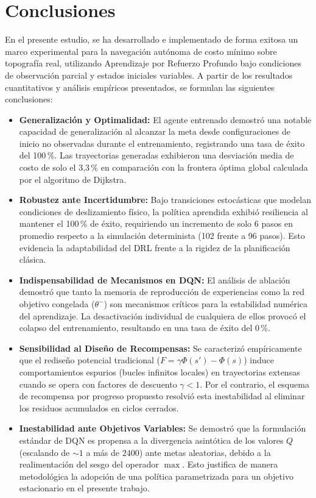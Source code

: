 \section{Conclusiones}
\label{sec:conc}

En el presente estudio, se ha desarrollado e implementado de forma exitosa un marco experimental para la navegación autónoma de costo mínimo sobre topografía real, utilizando Aprendizaje por Refuerzo Profundo bajo condiciones de observación parcial y estados iniciales variables. A partir de los resultados cuantitativos y análisis empíricos presentados, se formulan las siguientes conclusiones:

\begin{itemize}
  \item \textbf{Generalización y Optimalidad:} El agente entrenado demostró una notable capacidad de generalización al alcanzar la meta desde configuraciones de inicio no observadas durante el entrenamiento, registrando una tasa de éxito del 100\,\%. Las trayectorias generadas exhibieron una desviación media de costo de solo el 3,3\,\% en comparación con la frontera óptima global calculada por el algoritmo de Dijkstra.
  \item \textbf{Robustez ante Incertidumbre:} Bajo transiciones estocásticas que modelan condiciones de deslizamiento físico, la política aprendida exhibió resiliencia al mantener el 100\,\% de éxito, requiriendo un incremento de solo 6 pasos en promedio respecto a la simulación determinista (102 frente a 96 pasos). Esto evidencia la adaptabilidad del DRL frente a la rigidez de la planificación clásica.
  \item \textbf{Indispensabilidad de Mecanismos en DQN:} El análisis de ablación demostró que tanto la memoria de reproducción de experiencias como la red objetivo congelada ($\theta^-$) son mecanismos críticos para la estabilidad numérica del aprendizaje. La desactivación individual de cualquiera de ellos provocó el colapso del entrenamiento, resultando en una tasa de éxito del 0\,\%.
  \item \textbf{Sensibilidad al Diseño de Recompensas:} Se caracterizó empíricamente que el rediseño potencial tradicional ($F = \gamma \Phi(s') - \Phi(s)$) induce comportamientos espurios (bucles infinitos locales) en trayectorias extensas cuando se opera con factores de descuento $\gamma < 1$. Por el contrario, el esquema de recompensa por progreso propuesto resolvió esta inestabilidad al eliminar los residuos acumulados en ciclos cerrados.
  \item \textbf{Inestabilidad ante Objetivos Variables:} Se demostró que la formulación estándar de DQN es propensa a la divergencia asintótica de los valores $Q$ (escalando de $\sim 1$ a más de $2400$) ante metas aleatorias, debido a la realimentación del sesgo del operador $\max$. Esto justifica de manera metodológica la adopción de una política parametrizada para un objetivo estacionario en el presente trabajo.
\end{itemize}
